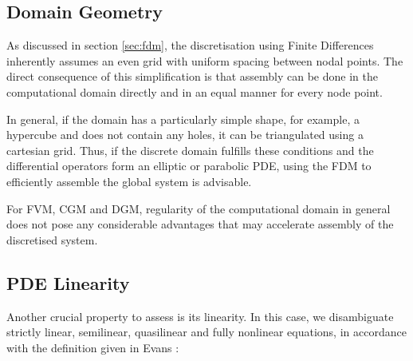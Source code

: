 \documentclass[sn-mathphys,Numbered]{sn-jnl}%
\theoremstyle{thmstyleone}%
\theoremstyle{thmstyletwo}%
\theoremstyle{thmstylethree}%
\begin{document}
\subsection{Domain Geometry}\label{sec:domain-geometry}

As discussed in section \ref{sec:fdm}, the discretisation using Finite Differences inherently assumes an even grid with uniform spacing between nodal points.
The direct consequence of this simplification is that assembly can be done in the computational domain directly and in an equal manner for every node point.

In general, if the domain has a particularly simple shape, for example, a hypercube and does not contain any holes, it can be triangulated using a cartesian grid.
Thus, if the discrete domain fulfills these conditions and the differential operators form an elliptic or parabolic PDE, using the FDM to efficiently assemble the global system is advisable.

For FVM, CGM and DGM, regularity of the computational domain in general does not pose any considerable advantages that may accelerate assembly of the discretised system.

\subsection{PDE Linearity}\label{sec:pde-linearity}

Another crucial property to assess is its linearity.
In this case, we disambiguate strictly linear, semilinear, quasilinear and fully nonlinear equations, in accordance with the definition given in Evans \cite{evansPartialDifferentialEquations2010}:
\end{document}
